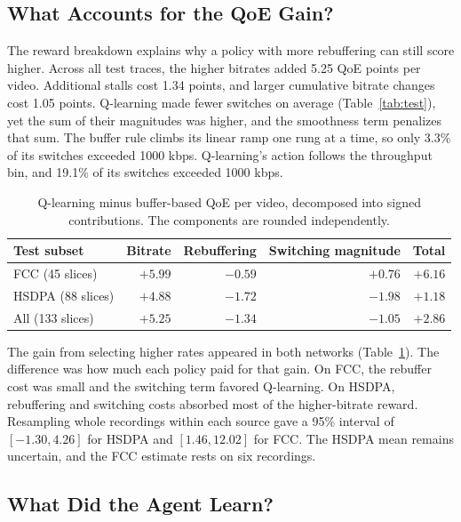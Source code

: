 \documentclass[10pt,letterpaper]{article}
\newif\ifreview
\newcommand{\reviewcolor}{\ifreview\color{reviewred}\fi}
\newenvironment{reviewedit}{\reviewcolor}{}
\begin{document}
\begin{reviewedit}
\subsection{What Accounts for the QoE Gain?}

The reward breakdown explains why a policy with more rebuffering can still
score higher. Across all test traces, the higher bitrates added 5.25 QoE
points per video. Additional stalls cost 1.34 points, and larger cumulative
bitrate changes cost 1.05 points. Q-learning made fewer switches on average
(Table~\ref{tab:test}), yet the sum of their magnitudes was higher, and the
smoothness term penalizes that sum. The buffer rule climbs its linear ramp one
rung at a time, so only 3.3\% of its switches exceeded 1000 kbps. Q-learning's
action follows the throughput bin, and 19.1\% of its switches exceeded
1000 kbps.

\begin{table}[htbp]
\reviewcolor
\centering
\small
\caption{Q-learning minus buffer-based QoE per video, decomposed into
signed contributions. The components are rounded independently.}
\label{tab:decomposition}
\begin{tabular}{lrrrr}
\toprule
Test subset & Bitrate & Rebuffering & Switching magnitude & Total \\
\midrule
FCC (45 slices) & \(+5.99\) & \(-0.59\) & \(+0.76\) & \(+6.16\) \\
HSDPA (88 slices) & \(+4.88\) & \(-1.72\) & \(-1.98\) & \(+1.18\) \\
All (133 slices) & \(+5.25\) & \(-1.34\) & \(-1.05\) & \(+2.86\) \\
\bottomrule
\end{tabular}
\end{table}

The gain from selecting higher rates appeared in both networks
(Table~\ref{tab:decomposition}). The difference was how much each policy paid
for that gain. On FCC, the rebuffer cost was small and the switching term
favored Q-learning. On HSDPA, rebuffering and switching costs absorbed most
of the higher-bitrate reward. Resampling whole recordings within each source
gave a 95\% interval of \([-1.30, 4.26]\) for HSDPA and \([1.46, 12.02]\)
for FCC. The HSDPA mean remains uncertain, and the FCC estimate rests on
six recordings.

\subsection{What Did the Agent Learn?}
\label{sec:learned}


\end{reviewedit}
\end{document}
